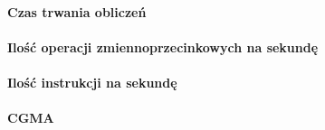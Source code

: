 \paragraph{Czas trwania obliczeń}

\paragraph{Ilość operacji zmiennoprzecinkowych na sekundę}

\paragraph{Ilość instrukcji na sekundę}

\paragraph{CGMA}

